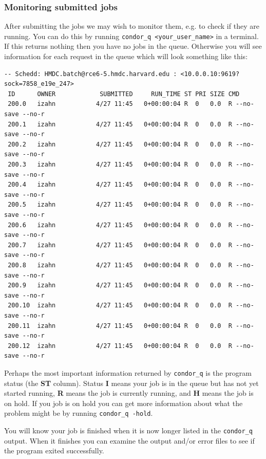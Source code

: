 \documentclass[11pt]{article}
\begin{document}
\subsubsection{Monitoring submitted jobs}
\label{sec-7-3-3}
After submitting the jobs we may wish to monitor them, e.g. to check if they are running. You can do this by running \texttt{condor\_q <your\_user\_name>} in a terminal. If this returns nothing then you have no jobs in the queue. Otherwise you will see information for each request in the queue which will look something like this:
\begin{verbatim}
-- Schedd: HMDC.batch@rce6-5.hmdc.harvard.edu : <10.0.0.10:9619?sock=7858_e19e_247>
 ID      OWNER            SUBMITTED     RUN_TIME ST PRI SIZE CMD               
 200.0   izahn           4/27 11:45   0+00:00:04 R  0   0.0  R --no-save --no-r
 200.1   izahn           4/27 11:45   0+00:00:04 R  0   0.0  R --no-save --no-r
 200.2   izahn           4/27 11:45   0+00:00:04 R  0   0.0  R --no-save --no-r
 200.3   izahn           4/27 11:45   0+00:00:04 R  0   0.0  R --no-save --no-r
 200.4   izahn           4/27 11:45   0+00:00:04 R  0   0.0  R --no-save --no-r
 200.5   izahn           4/27 11:45   0+00:00:04 R  0   0.0  R --no-save --no-r
 200.6   izahn           4/27 11:45   0+00:00:04 R  0   0.0  R --no-save --no-r
 200.7   izahn           4/27 11:45   0+00:00:04 R  0   0.0  R --no-save --no-r
 200.8   izahn           4/27 11:45   0+00:00:04 R  0   0.0  R --no-save --no-r
 200.9   izahn           4/27 11:45   0+00:00:04 R  0   0.0  R --no-save --no-r
 200.10  izahn           4/27 11:45   0+00:00:04 R  0   0.0  R --no-save --no-r
 200.11  izahn           4/27 11:45   0+00:00:04 R  0   0.0  R --no-save --no-r
 200.12  izahn           4/27 11:45   0+00:00:04 R  0   0.0  R --no-save --no-r
\end{verbatim}
Perhaps the most important information returned by \texttt{condor\_q} is the program status (the \textbf{ST} column). Status \textbf{I} means your job is in the queue but has not yet started running, \textbf{R} means the job is currently running, and \textbf{H} means the job is on hold. If you job is on hold you can get more information about what the problem might be by running \texttt{condor\_q -hold}.

You will know your job is finished when it is now longer listed in the \texttt{condor\_q} output. When it finishes you can examine the output and/or error files to see if the program exited successfully.
\end{document}
